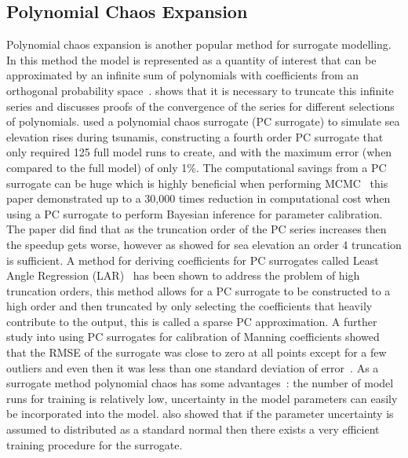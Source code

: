 \documentclass[12pt,a4paper]{article}
\begin{document}
\subsection{Polynomial Chaos Expansion}
\noindent
Polynomial chaos expansion is another popular method for surrogate modelling. In this method the model is represented as a quantity of interest that can be approximated by an infinite sum of polynomials with coefficients from an orthogonal probability space~\cite{xiu}.  shows that it is necessary to truncate this infinite series and discusses proofs of the convergence of the series for different selections of polynomials.  used a polynomial chaos surrogate (PC surrogate) to simulate sea elevation rises during tsunamis, constructing a fourth order PC surrogate that only required 125 full model runs to create, and with the maximum error (when compared to the full model) of only 1\%. The computational savings from a PC surrogate can be huge which is highly beneficial when performing MCMC~\cite{pccost} this paper demonstrated up to a 30,000 times reduction in computational cost when using a PC surrogate to perform Bayesian inference for parameter calibration. The paper did find that as the truncation order of the PC series increases then the speedup gets worse, however as  showed for sea elevation an order 4 truncation is sufficient. A method for deriving coefficients for PC surrogates called Least Angle Regression (LAR)~\cite{lar} has been shown to address the problem of high truncation orders, this method allows for a PC surrogate to be constructed to a high order and then truncated by only selecting the coefficients that heavily contribute to the output, this is called a sparse PC approximation. A further study into using PC surrogates for calibration of Manning coefficients showed that the RMSE of the surrogate was close to zero at all points except for a few outliers and even then it was less than one standard deviation of error~\cite{pcrmse}. As a surrogate method polynomial chaos has some advantages~\cite{pcadv}:  the number of model runs for training is relatively low, uncertainty in the model parameters can easily be incorporated into the model.  also showed that if the parameter uncertainty is assumed to distributed as a standard normal then there exists a very efficient training procedure for the surrogate. 
\end{document}
